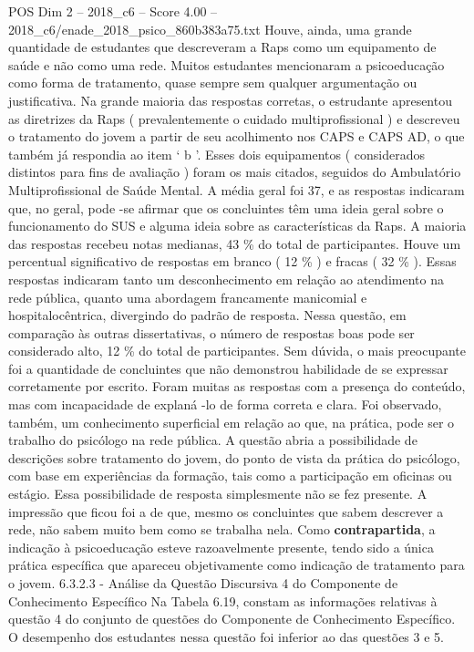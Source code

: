 \begin{textsample}{POS Dim 2 – 2018\_c6 – Score 4.00 – 2018\_c6/enade\_2018\_psico\_860b383a75.txt}
Houve, ainda, uma grande quantidade de estudantes que descreveram a Raps como um equipamento de saúde e não como uma rede.
Muitos estudantes mencionaram a psicoeducação como forma de tratamento, quase sempre sem qualquer argumentação ou justificativa.
Na grande maioria das respostas corretas, o estrudante apresentou as diretrizes da Raps ( prevalentemente o cuidado multiprofissional ) e descreveu o tratamento do jovem a partir de seu acolhimento nos CAPS e CAPS AD, o que também já respondia ao item ‘ b ’.
Esses dois equipamentos ( considerados distintos para fins de avaliação ) foram os mais citados, seguidos do Ambulatório Multiprofissional de Saúde Mental.
A média geral foi 37, e as respostas indicaram que, no geral, pode -se afirmar que os concluintes têm uma ideia geral sobre o funcionamento do SUS e alguma ideia sobre as características da Raps.
A maioria das respostas recebeu notas medianas, 43 \% do total de participantes.
Houve um percentual significativo de respostas em branco ( 12 \% ) e fracas ( 32 \% ).
Essas respostas indicaram tanto um desconhecimento em relação ao atendimento na rede pública, quanto uma abordagem francamente manicomial e hospitalocêntrica, divergindo do padrão de resposta.
Nessa questão, em comparação às outras dissertativas, o número de respostas boas pode ser considerado alto, 12 \% do total de participantes.
Sem dúvida, o mais preocupante foi a quantidade de concluintes que não demonstrou habilidade de se expressar corretamente por escrito.
Foram muitas as respostas com a presença do conteúdo, mas com incapacidade de explaná -lo de forma correta e clara.
Foi observado, também, um conhecimento superficial em relação ao que, na prática, pode ser o trabalho do psicólogo na rede pública.
A questão abria a possibilidade de descrições sobre tratamento do jovem, do ponto de vista da prática do psicólogo, com base em experiências da formação, tais como a participação em oficinas ou estágio.
Essa possibilidade de resposta simplesmente não se fez presente.
A impressão que ficou foi a de que, mesmo os concluintes que sabem descrever a rede, não sabem muito bem como se trabalha nela.
Como \textbf{contrapartida}, a indicação à psicoeducação esteve razoavelmente presente, tendo sido a única prática específica que apareceu objetivamente como indicação de tratamento para o jovem. 6.3.2.3 - Análise da Questão Discursiva 4 do Componente de Conhecimento Específico Na Tabela 6.19, constam as informações relativas à questão 4 do conjunto de questões do Componente de Conhecimento Específico.
O desempenho dos estudantes nessa questão foi inferior ao das questões 3 e 5.

\end{textsample}
